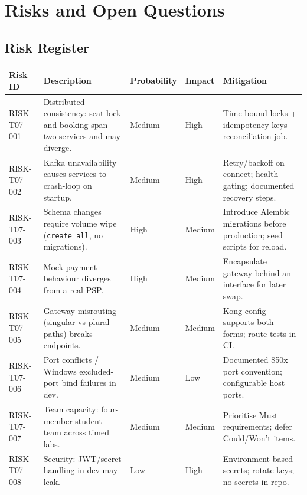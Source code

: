 \documentclass[11pt,a4paper]{article}
\newcommand{\rowstyle}{\rowcolor{headergray}}
\begin{document}
\section{Risks and Open Questions}

\subsection{Risk Register}
\begin{longtable}{p{2.1cm} Y p{1.9cm} p{1.6cm} Y}
\toprule
\rowstyle \textbf{Risk ID} & \textbf{Description} & \textbf{Probability} & \textbf{Impact} & \textbf{Mitigation} \\
\midrule
\endhead
RISK-T07-001 & Distributed consistency: seat lock and booking span two services and may diverge. & Medium & High & Time-bound locks + idempotency keys + reconciliation job. \\
RISK-T07-002 & Kafka unavailability causes services to crash-loop on startup. & Medium & High & Retry/backoff on connect; health gating; documented recovery steps. \\
RISK-T07-003 & Schema changes require volume wipe (\texttt{create\_all}, no migrations). & High & Medium & Introduce Alembic migrations before production; seed scripts for reload. \\
RISK-T07-004 & Mock payment behaviour diverges from a real PSP. & High & Medium & Encapsulate gateway behind an interface for later swap. \\
RISK-T07-005 & Gateway misrouting (singular vs plural paths) breaks endpoints. & Medium & Medium & Kong config supports both forms; route tests in CI. \\
RISK-T07-006 & Port conflicts / Windows excluded-port bind failures in dev. & Medium & Low & Documented 850x port convention; configurable host ports. \\
RISK-T07-007 & Team capacity: four-member student team across timed labs. & Medium & Medium & Prioritise Must requirements; defer Could/Won't items. \\
RISK-T07-008 & Security: JWT/secret handling in dev may leak. & Low & High & Environment-based secrets; rotate keys; no secrets in repo. \\
\bottomrule
\end{longtable}
\end{document}
